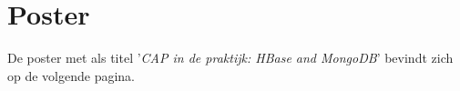 \chapter{Poster}
De poster met als titel '\textit{CAP in de praktijk: HBase and MongoDB}' bevindt zich op de volgende pagina. 
